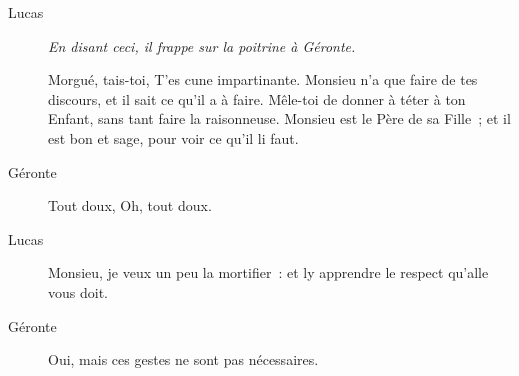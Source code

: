 \documentclass[french,twoside]{book} %
\begin{document}
 \begin{description} \item[Lucas] \textit{En disant ceci, il frappe sur la poitrine à Géronte.} 

Morgué, tais-toi, T’es cune impartinante. Monsieu n’a que faire de tes discours, et il sait ce qu’il a à faire. Mêle-toi de donner à téter à ton Enfant, sans tant faire la raisonneuse. Monsieu est le Père de sa Fille ; et il est bon et sage, pour voir ce qu’il li faut.\end{description}
 \begin{description} \item[Géronte] 

Tout doux, Oh, tout doux.\end{description}
 \begin{description} \item[Lucas] 

Monsieu, je veux un peu la mortifier : et ly apprendre le respect qu’alle vous doit.\end{description}
 \begin{description} \item[Géronte] 

Oui, mais ces gestes ne sont pas nécessaires.\end{description}
\end{document}
